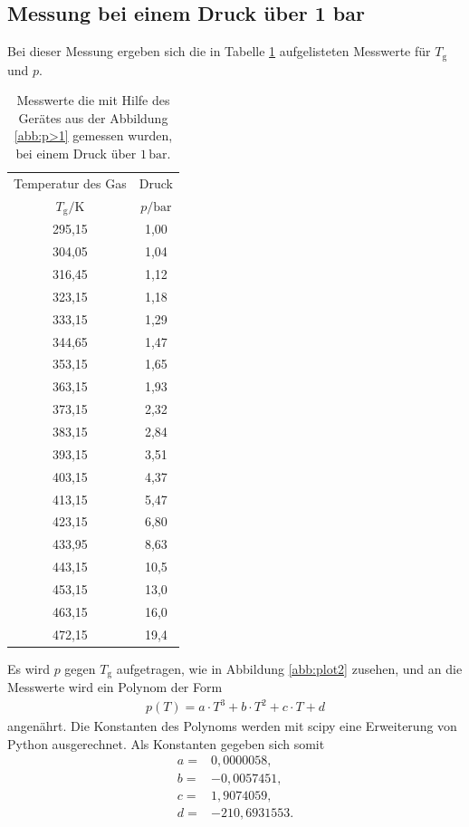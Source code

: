 \subsection{Messung bei einem Druck über 1 bar}
Bei dieser Messung ergeben sich die in Tabelle \ref{tab:p>1} aufgelisteten Messwerte für $T_\mathrm{g}$ und $p$.
\begin{table}   %
  \centering
  \caption{Messwerte die mit Hilfe des Gerätes aus der Abbildung \ref{abb:p>1} gemessen wurden, bei einem Druck über $1\,\si{\bar}$.}
  \label{tab:p>1}
  \begin{tabular}{c c}
    \toprule
    Temperatur des Gas &  Druck \\
    $T_\mathrm{g}/ \si{\kelvin}$ & $p/\si{\bar} $ \\
    \midrule
    295,15 & 1,00\\
    304,05 & 1,04\\
    316,45 & 1,12\\
    323,15 & 1,18\\
    333,15 & 1,29\\
    344,65 & 1,47\\
    353,15 & 1,65\\
    363,15 & 1,93\\
    373,15 & 2,32\\
    383,15 & 2,84\\
    393,15 & 3,51\\
    403,15 & 4,37\\
    413,15 & 5,47\\
    423,15 & 6,80\\
    433,95 & 8,63\\
    443,15 & 10,5\\
    453,15 & 13,0\\
    463,15 & 16,0\\
    472,15 & 19,4\\
    \bottomrule
  \end{tabular}
\end{table}
\FloatBarrier
Es wird $p$ gegen $T_\mathrm{g}$ aufgetragen, wie in Abbildung \ref{abb:plot2} zusehen, und an die Messwerte wird ein Polynom
der Form
\begin{align*}
p(T)=a\cdot T^3+b\cdot T^2 + c\cdot T + d
\end{align*}
angenährt.
Die Konstanten des Polynoms werden mit scipy eine Erweiterung von Python ausgerechnet. Als Konstanten gegeben sich somit
\begin{align*}
  a =&0,0000058,\\
  b =&-0,0057451,\\
  c =&1,9074059,\\
  d =&-210,6931553.
\end{align*}
